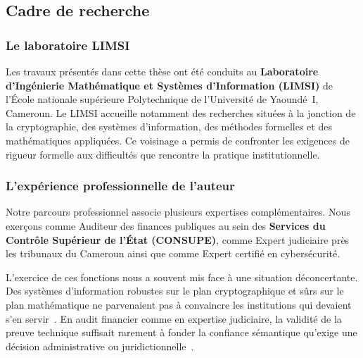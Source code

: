 \subsection{Cadre de recherche}
\label{subsec:cadre_recherche}
\begin{sloppypar}

\subsubsection{Le laboratoire LIMSI}
\label{subsubsec:limsi}

Les travaux pr\'esent\'es dans cette th\`ese ont \'et\'e conduits au
\textbf{Laboratoire d'Ing\'enierie Math\'ematique et Syst\`emes d'Information
(LIMSI)} de l'\'Ecole nationale sup\'erieure Polytechnique de l'Universit\'e
de Yaound\'e~I, Cameroun. Le LIMSI accueille notamment des recherches situ\'ees \`a la
jonction de la cryptographie, des syst\`emes d'information, des m\'ethodes formelles et des math\'ematiques appliqu\'ees. Ce voisinage a permis de confronter les exigences de rigueur formelle aux difficult\'es que rencontre la pratique institutionnelle.

\subsubsection{L'exp\'erience professionnelle de l'auteur}
\label{subsubsec:experience_auteur}

Notre parcours professionnel associe plusieurs expertises compl\'ementaires. Nous exer\c{c}ons comme Auditeur des finances publiques au sein des \textbf{Services du Contr\^ole Sup\'erieur de l'\'Etat (CONSUPE)}, comme Expert judiciaire pr\`es les tribunaux du Cameroun ainsi que comme Expert certifi\'e en cybers\'ecurit\'e.

L'exercice de ces fonctions nous a souvent mis face \`a une situation d\'econcertante. Des syst\`emes d'information robustes sur le plan cryptographique et s\^urs sur le plan math\'ematique ne parvenaient pas \`a convaincre les institutions qui devaient s'en servir~\cite{Bonneau16,Narayanan16}. En audit financier comme en expertise judiciaire, la validit\'e de la preuve technique suffisait rarement \`a fonder la confiance s\'emantique qu'exige une d\'ecision administrative ou juridictionnelle~\cite{Casey16,Grimmelmann15}.

\end{sloppypar}

